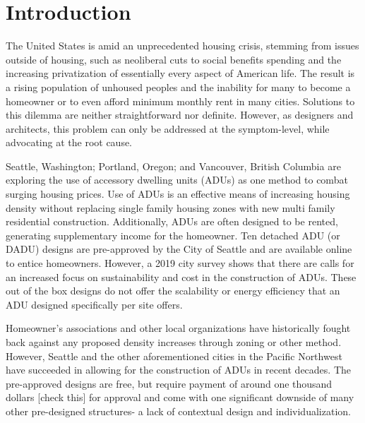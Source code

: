 \documentclass[sagev,times,Review]{sagej}
\begin{document}

\maketitle

\section{Introduction}
The United States is amid an unprecedented housing crisis, stemming from issues outside of housing, such as neoliberal cuts to social benefits spending and the increasing privatization of essentially every aspect of American life. The result is a rising population of unhoused peoples and the inability for many to become a homeowner or to even afford minimum monthly rent in many cities. Solutions to this dilemma are neither straightforward nor definite. However, as designers and architects, this problem can only be addressed at the symptom-level, while advocating at the root cause. 


Seattle, Washington; Portland, Oregon; and Vancouver, British Columbia are exploring the use of accessory dwelling units (ADUs) as one method to combat surging housing prices. Use of ADUs is an effective means of increasing housing density without replacing single family housing zones with new multi family residential construction. Additionally, ADUs are often designed to be rented, generating supplementary income for the homeowner. Ten detached ADU (or DADU) designs are pre-approved by the City of Seattle and are available online to entice homeowners. However, a 2019 city survey shows that there are calls for an increased focus on sustainability and cost in the construction of ADUs\cite{seattlePreapprovedPlansAccessory2019}. These out of the box designs do not offer the scalability or energy efficiency that an ADU designed specifically per site offers.


Homeowner’s associations and other local organizations have historically fought back against any proposed density increases through zoning or other method. However, Seattle and the other aforementioned cities in the Pacific Northwest have succeeded in allowing for the construction of ADUs in recent decades. The pre-approved designs are free, but require payment of around one thousand dollars [check this] for approval and come with one significant downside of many other pre-designed structures- a lack of contextual design and individualization.
\end{document}
